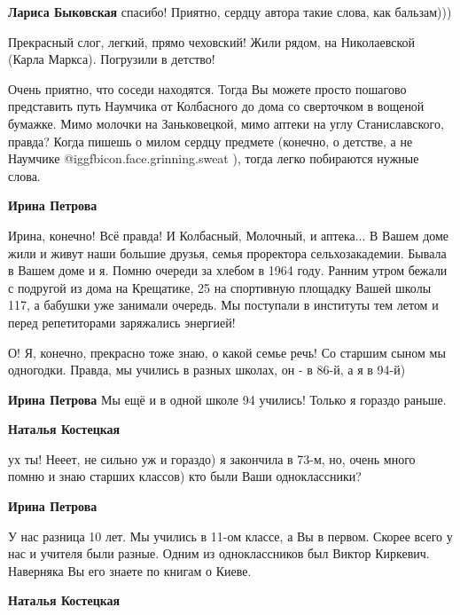 \begin{itemize}
\begin{itemize} %
\textbf{Лариса Быковская} спасибо! Приятно, сердцу автора такие слова, как бальзам)))
\end{itemize} %


Прекрасный слог, легкий, прямо чеховский! Жили рядом, на Николаевской (Карла
Маркса). Погрузили в детство!

\begin{itemize} %

Очень приятно, что соседи находятся. Тогда Вы можете просто пошагово
представить путь Наумчика от Колбасного до дома со сверточком в вощеной
бумажке. Мимо молочки на Заньковецкой, мимо аптеки на углу Станиславского,
правда? Когда пишешь о милом сердцу предмете (конечно, о детстве, а не
Наумчике @igg{fbicon.face.grinning.sweat} ), тогда легко побираются нужные слова.

\textbf{Ирина Петрова} 

Ирина, конечно! Всё правда! И Колбасный, Молочный, и аптека... В Вашем доме жили
и живут наши большие друзья, семья проректора сельхозакадемии. Бывала в Вашем
доме и я. Помню очереди за хлебом в 1964 году. Ранним утром бежали с подругой из
дома на Крещатике, 25 на спортивную площадку Вашей школы 117, а бабушки уже
занимали очередь. Мы поступали в институты тем летом и перед репетиторами
заряжались энергией!


О! Я, конечно, прекрасно тоже знаю, о какой семье речь! Со старшим сыном мы
одногодки. Правда, мы учились в разных школах, он - в 86-й, а я в 94-й)


\textbf{Ирина Петрова} Мы ещё и в одной школе 94 учились! Только я гораздо раньше.

\textbf{Наталья Костецкая} 

ух ты! Нееет, не сильно уж и гораздо) я закончила в 73-м, но, очень много помню
и знаю старших классов) кто были Ваши одноклассники?

\textbf{Ирина Петрова} 

У нас разница 10 лет. Мы учились в 11-ом классе, а Вы в первом. Скорее всего у
нас и учителя были разные. Одним из одноклассников был Виктор Киркевич.
Наверняка Вы его знаете по книгам о Киеве.


\textbf{Наталья Костецкая} 


\end{itemize}
\end{itemize}
